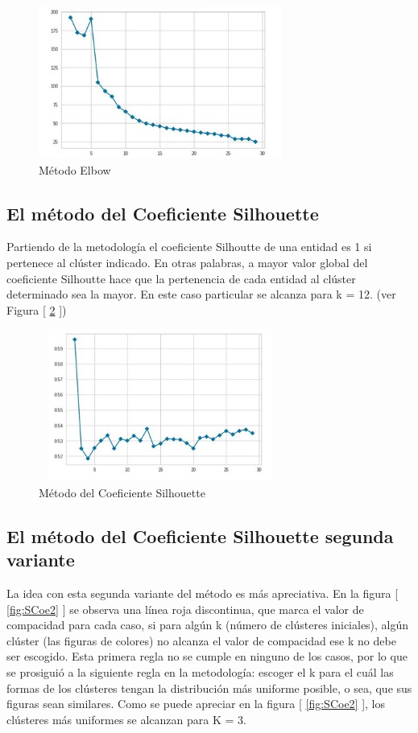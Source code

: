 \begin{figure}[h!]
	\centering
	\includegraphics[width=8cm, height=5cm]{Images/Elbow.jpg} 
	\caption{Método Elbow }
	\label{fig:Elbow}
\end{figure}

\subsection{El método del Coeficiente Silhouette}
Partiendo de la metodología el coeficiente Silhoutte de una entidad es 1 si pertenece al clúster indicado. En otras palabras, a mayor valor global del coeficiente Silhoutte hace que la pertenencia de cada entidad al clúster determinado sea la mayor. En este caso particular se alcanza para k = 12. (ver Figura [ \ref*{fig:SCoe1} ])

\begin{figure}[h!]
	\centering
	\includegraphics[width=8cm, height=5cm]{Images/SCoe1.jpg} 
	\caption{Método del Coeficiente Silhouette}
	\label{fig:SCoe1}
\end{figure}

\subsection{El método del Coeficiente Silhouette segunda variante}
La idea con esta segunda variante del método es más apreciativa. En la figura [ \ref{fig:SCoe2} ] se observa una línea roja discontinua, que marca el valor de compacidad para cada caso, si para algún k (número de clústeres iniciales), algún clúster (las figuras de colores) no alcanza el valor de compacidad ese k no debe ser escogido. Esta primera regla no se cumple en ninguno de los casos, por lo que se prosiguió a la siguiente regla en la metodología: escoger el k para el cuál las formas de los clústeres tengan la distribución más uniforme posible, o sea, que sus figuras sean similares. Como se puede apreciar en la figura [ \ref{fig:SCoe2} ], los clústeres más uniformes se alcanzan para K = 3.

